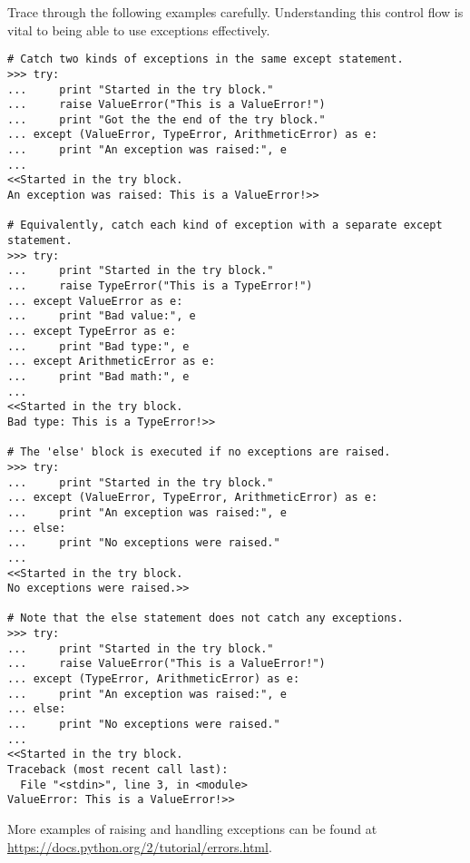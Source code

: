 Trace through the following examples carefully.
Understanding this control flow is vital to being able to use exceptions effectively.

\begin{lstlisting}
# Catch two kinds of exceptions in the same except statement.
>>> try:
...     print "Started in the try block."
...     raise ValueError("This is a ValueError!")
...     print "Got the the end of the try block."
... except (ValueError, TypeError, ArithmeticError) as e:
...     print "An exception was raised:", e
...
<<Started in the try block.
An exception was raised: This is a ValueError!>>

# Equivalently, catch each kind of exception with a separate except statement.
>>> try:
...     print "Started in the try block."
...     raise TypeError("This is a TypeError!")
... except ValueError as e:
...     print "Bad value:", e
... except TypeError as e:
...     print "Bad type:", e
... except ArithmeticError as e:
...     print "Bad math:", e
...
<<Started in the try block.
Bad type: This is a TypeError!>>

# The 'else' block is executed if no exceptions are raised.
>>> try:
...     print "Started in the try block."
... except (ValueError, TypeError, ArithmeticError) as e:
...     print "An exception was raised:", e
... else:
...     print "No exceptions were raised."
...
<<Started in the try block.
No exceptions were raised.>>

# Note that the else statement does not catch any exceptions.
>>> try:
...     print "Started in the try block."
...     raise ValueError("This is a ValueError!")
... except (TypeError, ArithmeticError) as e:
...     print "An exception was raised:", e
... else:
...     print "No exceptions were raised."
...
<<Started in the try block.
Traceback (most recent call last):
  File "<stdin>", line 3, in <module>
ValueError: This is a ValueError!>>
\end{lstlisting}

More examples of raising and handling exceptions can be found at \url{https://docs.python.org/2/tutorial/errors.html}.

